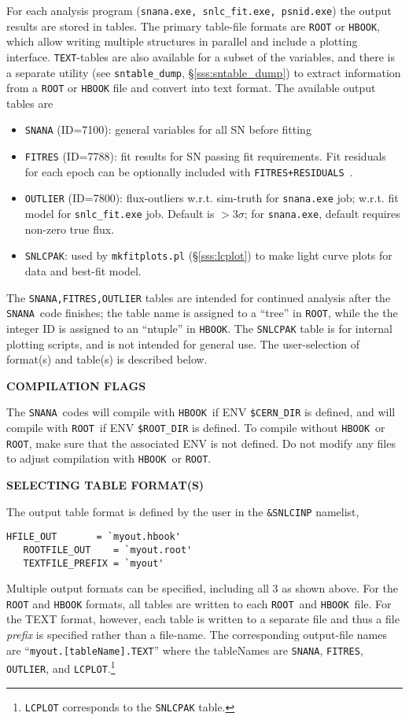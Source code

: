 \documentclass[12pt]{article}
\newcommand{\ROOT}{{\tt ROOT}}
\newcommand{\HBOOK}{{\tt HBOOK}}
\newcommand{\snana}{{\tt SNANA}}
\begin{document}
{For each analysis program
({\tt snana.exe, snlc\_fit.exe, psnid.exe})
the output results are stored in tables.
The primary table-file formats are {\ROOT} or {\HBOOK},
which allow writing multiple structures in parallel
and include a plotting interface. {\tt TEXT}-tables are 
also available for a subset of the variables, and there is a 
separate utility (see {\tt sntable\_dump}, \S\ref{sss:sntable_dump})
to extract information from a {\ROOT} or {\HBOOK} file 
and convert into text format.
The available output tables are
\begin{itemize}
  \item {\tt SNANA} (ID=7100): general variables for all SN before fitting
  \item {\tt FITRES} (ID=7788): fit results for SN passing fit requirements.
      Fit residuals for each epoch can be optionally included with
      {\tt FITRES+RESIDUALS}~.
  \item {\tt OUTLIER} (ID=7800): 
      flux-outliers w.r.t. sim-truth for {\tt snana.exe} job;
      w.r.t. fit model for {\tt snlc\_fit.exe} job.
      Default is $>3\sigma$; for {\tt snana.exe}, 
      default requires non-zero true flux.
  \item {\tt SNLCPAK}: used by {\tt mkfitplots.pl} (\S\ref{sss:lcplot})
         to make light curve plots for data and best-fit model.
\end{itemize}
%
The {\tt SNANA,FITRES,OUTLIER} tables are intended for continued 
analysis after the \snana\ code finishes; 
the table name is assigned to a ``tree'' in \ROOT, 
while the the integer ID is assigned to an ``ntuple'' in \HBOOK. 
The {\tt SNLCPAK} table is for internal plotting scripts, and is not
intended for general use.
The user-selection of format(s) and table(s) is described below.

\bigskip\centerline{\bf\large COMPILATION FLAGS}
\medskip
The \snana\ codes will compile with \HBOOK\ if 
ENV {\tt\$CERN\_DIR} is defined, and will compile with \ROOT\
if ENV {\tt\$ROOT\_DIR} is defined. To compile without
\HBOOK\ or \ROOT, make sure that the associated ENV is 
not defined. Do not modify any files to adjust compilation
with \HBOOK\ or \ROOT.


\bigskip\centerline{\bf\large SELECTING TABLE FORMAT(S) }
\medskip

The output table format is defined by the user in the
{\tt \&SNLCINP} namelist,
\begin{Verbatim}[frame=single]
   HFILE_OUT       = `myout.hbook'
   ROOTFILE_OUT    = `myout.root'
   TEXTFILE_PREFIX = `myout'
\end{Verbatim}
%
Multiple output formats can be specified, including all 3 as 
shown above. For the {\ROOT} and {\HBOOK} formats, 
all tables are written to each \ROOT\ and \HBOOK\ file.
For the TEXT format, however, each table is written
to a separate file and thus a file {\em prefix} is specified
rather than a file-name. The corresponding output-file names 
are ``{\tt myout.[tableName].TEXT}'' where the tableNames are
{\tt SNANA}, {\tt FITRES}, {\tt OUTLIER}, and 
{\tt LCPLOT}.\footnote{{\tt LCPLOT} corresponds to the {\tt SNLCPAK} table.}


}
\end{document}
